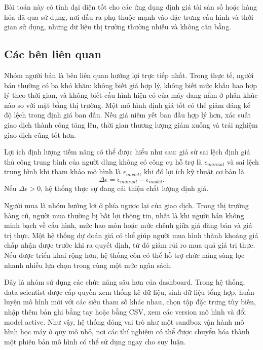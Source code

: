 Bài toán này có tính đại diện tốt cho các ứng dụng định giá tài sản số hoặc hàng hóa đã qua sử dụng, nơi đầu ra phụ thuộc mạnh vào đặc trưng cấu hình và thời gian sử dụng, nhưng dữ liệu thị trường thường nhiễu và không cân bằng.

\subsection{Các bên liên quan}


Nhóm người bán là bên liên quan hưởng lợi trực tiếp nhất. Trong thực tế, người bán thường có ba khó khăn: không biết giá hợp lý, không biết mức khấu hao hợp lý theo thời gian, và không biết cấu hình hiện có của máy đang nằm ở phân khúc nào so với mặt bằng thị trường. Một mô hình định giá tốt có thể giảm đáng kể độ lệch trong định giá ban đầu. Nếu giá niêm yết ban đầu hợp lý hơn, xác suất giao dịch thành công tăng lên, thời gian thương lượng giảm xuống và trải nghiệm giao dịch cũng tốt hơn.

Lợi ích định lượng tiềm năng có thể được hiểu như sau: giả sử sai lệch định giá thủ công trung bình của người dùng không có công cụ hỗ trợ là $\epsilon_{manual}$ và sai lệch trung bình khi tham khảo mô hình là $\epsilon_{model}$, khi đó lợi ích kỹ thuật cơ bản là
$$
\Delta \epsilon = \epsilon_{manual} - \epsilon_{model}.
$$
Nếu $\Delta \epsilon > 0$, hệ thống thực sự đang cải thiện chất lượng định giá.


Người mua là nhóm hưởng lợi ở phía ngược lại của giao dịch. Trong thị trường hàng cũ, người mua thường bị bất lợi thông tin, nhất là khi người bán không minh bạch về cấu hình, mức hao mòn hoặc mức chênh giữa giá đăng bán và giá trị thực. Một hệ thống dự đoán giá có thể giúp người mua hình thành khoảng giá chấp nhận được trước khi ra quyết định, từ đó giảm rủi ro mua quá giá trị thực. Nếu được triển khai rộng hơn, hệ thống còn có thể hỗ trợ chức năng sàng lọc nhanh nhiều lựa chọn trong cùng một mức ngân sách.


Đây là nhóm sử dụng các chức năng sâu hơn của dashboard. Trong hệ thống, data scientist được cấp quyền xem thống kê dữ liệu, sinh dữ liệu tổng hợp, huấn luyện mô hình mới với các siêu tham số khác nhau, chọn tập đặc trưng tùy biến, nhập thêm bản ghi bằng tay hoặc bằng CSV, xem các version mô hình và đổi model active. Như vậy, hệ thống đóng vai trò như một sandbox vận hành mô hình học máy ở quy mô nhỏ, nơi các thí nghiệm có thể được chuyển hóa thành một phiên bản mô hình có thể sử dụng ngay cho suy luận.

